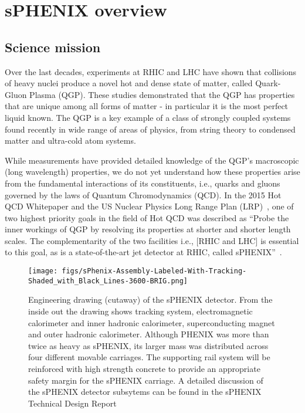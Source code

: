 \chapter{sPHENIX overview}
\label{chap:introduction}
\section{Science mission}
Over the last decades, experiments at RHIC and LHC have shown that collisions of heavy nuclei produce a novel hot and dense state of matter, called Quark-Gluon Plasma (QGP). These studies demonstrated that the QGP has properties that are unique among all forms of matter - in particular it is the most perfect liquid known. The QGP is a key example of a class of strongly coupled systems found recently in wide range of areas of physics, from string theory to condensed matter and ultra-cold atom systems.

While measurements have provided detailed knowledge of the QGP's macroscopic (long wavelength) properties, we do not yet understand how these properties arise from the fundamental interactions of its constituents, i.e., quarks and gluons governed by the laws of Quantum Chromodynamics (QCD).  In the 2015 Hot QCD Whitepaper and the US Nuclear Physics Long Range Plan (LRP)~\cite{Geesaman:2015fha}, one of two highest  priority goals in the field of Hot QCD was described as ``Probe the inner workings of QGP by resolving its properties at shorter and shorter length scales. The complementarity of the two facilities i.e., [RHIC and LHC] is essential to this goal, as is a state-of-the-art jet detector at RHIC, called sPHENIX''~\cite{Geesaman:2015fha}.

\begin{figure}[htpb]
\begin{center}
\texttt{[image: figs/sPhenix-Assembly-Labeled-With-Tracking-Shaded\_with\_Black\_Lines-3600-BRIG.png]}
\end{center}
\vspace{-0.5cm}
\caption{\label{fig:sPHENIX} Engineering drawing (cutaway) of the
  sPHENIX detector. From the inside out the drawing shows tracking
  system, electromagnetic calorimeter and inner hadronic calorimeter,
  superconducting magnet and outer hadronic calorimeter.  Although
  PHENIX was more than twice as heavy as sPHENIX, its larger mass was
  distributed across four different movable carriages.  The supporting
  rail system will be reinforced with high strength concrete to
  provide an appropriate safety margin for the sPHENIX carriage. A
  detailed discussion of the sPHENIX detector subsytems can be found
  in the sPHENIX Technical Design Report~\cite{sPHENIX:TDR}}
\end{figure}

